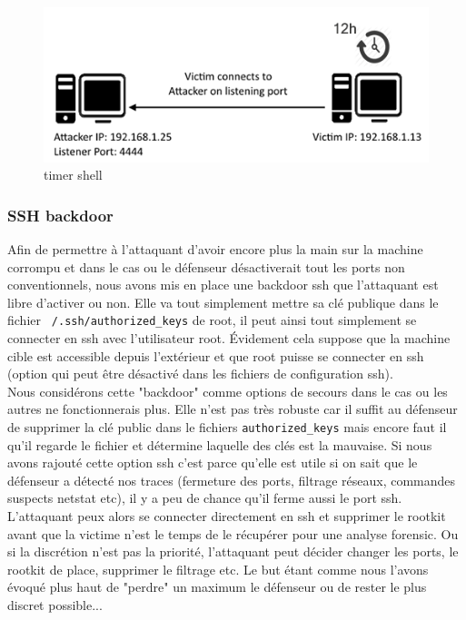 \documentclass[11pt]{article}
\begin{document}
\begin{figure}[H] 
\begin{center}
\includegraphics{./img/timer-shell.png}

\caption[dsfsdf]{timer shell}
\end{center}
\end{figure}
                    
            
        \subsubsection{SSH backdoor}
        
            Afin de permettre à l'attaquant d'avoir encore plus la main sur la machine corrompu et dans le cas ou le défenseur désactiverait tout les ports non conventionnels, nous avons mis en place une backdoor ssh que l'attaquant est libre d'activer ou non. Elle va tout simplement mettre sa clé publique  dans le fichier \texttt{~/.ssh/authorized\_keys} de root, il peut ainsi tout simplement se connecter en ssh avec l'utilisateur root. Évidement cela suppose que la machine cible est accessible depuis l'extérieur et que root puisse se connecter en ssh (option qui peut être désactivé dans les fichiers de configuration ssh). \\
            
            Nous considérons cette "backdoor" comme options de secours dans le cas ou les autres ne fonctionnerais plus. Elle n'est pas très robuste car il suffit au défenseur de supprimer la clé public  dans le fichiers \texttt{authorized\_keys} mais encore faut il qu'il regarde le fichier et détermine laquelle des clés est la mauvaise. 
            Si nous avons rajouté cette option ssh c'est parce qu'elle est utile si on sait que le défenseur a détecté nos traces (fermeture des ports, filtrage réseaux, commandes  suspects netstat etc), il y a peu de chance qu'il ferme aussi le port ssh. L'attaquant peux alors se connecter directement en ssh et supprimer le rootkit avant que la victime n'est le temps de le récupérer pour une analyse forensic. Ou si la discrétion n'est pas la priorité, l'attaquant peut décider changer les ports, le rootkit de place, supprimer le filtrage  etc. Le but étant comme nous l'avons évoqué plus haut de "perdre" un maximum le défenseur ou de rester le plus discret possible... 
            
\end{document}
